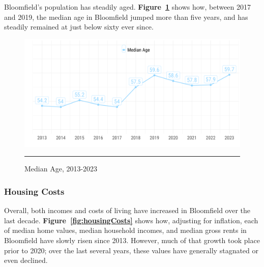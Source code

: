 \noindent Bloomfield's population has steadily aged. \textbf{Figure~\ref{fig:medianAge}} shows how, between 2017 and 2019, the median age in Bloomfield jumped more than five years, and has steadily remained at just below sixty ever since.

\begin{figure}[H]
\centering
\begin{framed}
    \caption{Median Age, 2013-2023}
    \label{fig:medianAge}
    \includegraphics[width=\linewidth]{figures/median_age.png}
    \rule[-5pt]{\linewidth}{0.4pt}
\end{framed}
\end{figure}

\pagebreak
\subsubsection*{Housing Costs}

\noindent Overall, both incomes and costs of living have increased in Bloomfield over the last decade. \textbf{Figure~\ref{fig:housingCosts}} shows how, adjusting for inflation, each of median home values, median household incomes, and median gross rents in Bloomfield have slowly risen since 2013. However, much of that growth took place prior to 2020; over the last several years, these values have generally stagnated or even declined.

